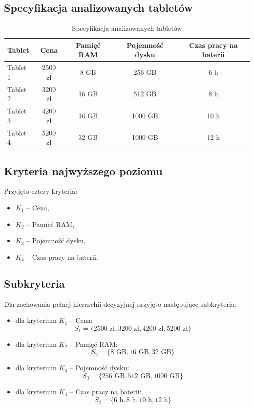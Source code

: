 \documentclass[12pt,a4paper]{article}
\begin{document}
\subsection*{Specyfikacja analizowanych tabletów}

\begin{table}[H]
\centering
\caption{Specyfikacja analizowanych tabletów}
\begin{tabular}{lcccc}
\toprule
\textbf{Tablet} & \textbf{Cena} & \textbf{Pamięć RAM} & \textbf{Pojemność dysku} & \textbf{Czas pracy na baterii} \\
\midrule
Tablet 1 & 2500 zł & 8 GB  & 256 GB  & 6 h \\
Tablet 2 & 3200 zł & 16 GB & 512 GB  & 8 h \\
Tablet 3 & 4200 zł & 16 GB & 1000 GB & 10 h \\
Tablet 4 & 5200 zł & 32 GB & 1000 GB & 12 h \\
\bottomrule
\end{tabular}
\end{table}

\subsection*{Kryteria najwyższego poziomu}

Przyjęto cztery kryteria:
\begin{itemize}
    \item \(K_1\) -- Cena,
    \item \(K_2\) -- Pamięć RAM,
    \item \(K_3\) -- Pojemność dysku,
    \item \(K_4\) -- Czas pracy na baterii.
\end{itemize}

\subsection*{Subkryteria}

Dla zachowania pełnej hierarchii decyzyjnej przyjęto następujące subkryteria:

\begin{itemize}
    \item dla kryterium \(K_1\) -- Cena:
    \[
    S_{1}=\{2500\text{ zł}, 3200\text{ zł}, 4200\text{ zł}, 5200\text{ zł}\}
    \]
    \item dla kryterium \(K_2\) -- Pamięć RAM:
    \[
    S_{2}=\{8\text{ GB}, 16\text{ GB}, 32\text{ GB}\}
    \]
    \item dla kryterium \(K_3\) -- Pojemność dysku:
    \[
    S_{3}=\{256\text{ GB}, 512\text{ GB}, 1000\text{ GB}\}
    \]
    \item dla kryterium \(K_4\) -- Czas pracy na baterii:
    \[
    S_{4}=\{6\text{ h}, 8\text{ h}, 10\text{ h}, 12\text{ h}\}
    \]
\end{itemize}
\end{document}
